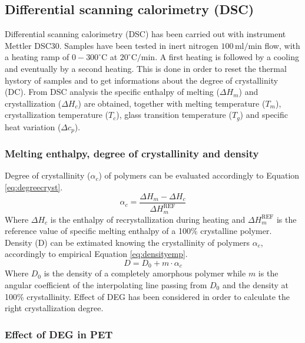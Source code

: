 \documentclass[a4paper, 11pt]{article}
\begin{document}
\subsection{Differential scanning calorimetry (DSC)}

Differential scanning calorimetry (DSC) has been carried out with instrument Mettler DSC30. Samples have been tested in inert nitrogen $100\,\text{ml/min}$ flow, with a heating ramp of $0-300^\circ$C at $20^\circ\text{C/min}$. A first heating is followed by a cooling and eventually by a second heating. This is done in order to reset the thermal hystory of samples and to get informations about the degree of crystallinity (DC). From DSC analysis the specific enthalpy of melting ($\Delta H_m$) and crystallization ($\Delta H_c$) are obtained, together with melting temperature ($T_m$), crystallization temperature ($T_c$), glass transition temperature ($T_g$) and specific heat variation ($\Delta c_p$). 

\subsubsection{Melting enthalpy, degree of crystallinity and density}

Degree of crystallinity ($\alpha_c$) of polymers can be evaluated accordingly to Equation \ref{eq:degreecryst}.
\begin{equation}
\alpha_c = \frac{\Delta H_m - \Delta H_c}{\Delta H_m^{\text{REF}}}
\label{eq:degreecryst}
\end{equation}
Where $\Delta H_c$ is the enthalpy of recrystallization during heating and $\Delta H_m^{\text{REF}}$ is the reference value of specific melting enthalpy of a 100\% crystalline polymer.\\
Density (D) can be extimated knowing the crystallinity of polymers $\alpha_c$, accordingly to empirical Equation \ref{eq:densityemp}.
\begin{equation}
D = D_0+m\cdot \alpha_c
\label{eq:densityemp}
\end{equation}
Where $D_0$ is the density of a completely amorphous polymer while $m$ is the angular coefficient of the interpolating line passing from $D_0$ and the density at 100\% crystallinity. Effect of DEG has been considered in order to calculate the right crystallization degree.

\subsubsection{Effect of DEG in PET}
\end{document}
